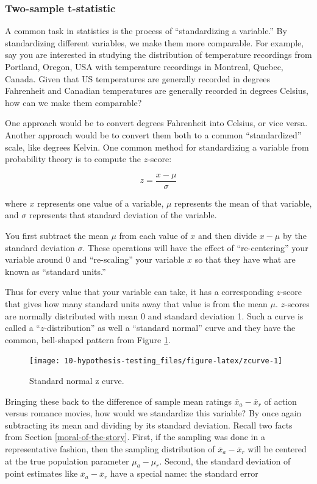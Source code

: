 \documentclass[
]{book}
\begin{document}
\hypertarget{two-sample-t-statistic}{%
\subsubsection*{Two-sample t-statistic}\label{two-sample-t-statistic}}

A common task in statistics is the process of ``standardizing a variable.'' By standardizing different variables, we make them more comparable. For example, say you are interested in studying the distribution of temperature recordings from Portland, Oregon, USA with temperature recordings in Montreal, Quebec, Canada. Given that US temperatures are generally recorded in degrees Fahrenheit and Canadian temperatures are generally recorded in degrees Celsius, how can we make them comparable?

One approach would be to convert degrees Fahrenheit into Celsius, or vice versa. Another approach would be to convert them both to a common ``standardized'' scale, like degrees Kelvin. One common method for standardizing a variable from probability theory is to compute the  \(z\)-score:

\[z = \frac{x - \mu}{\sigma}\]

where \(x\) represents one value of a variable, \(\mu\) represents the mean of that variable, and \(\sigma\) represents that standard deviation of the variable.

You first subtract the mean \(\mu\) from each value of \(x\) and then divide \(x - \mu\) by the standard deviation \(\sigma\). These operations will have the effect of ``re-centering'' your variable around 0 and ``re-scaling'' your variable \(x\) so that they have what are known as ``standard units.''

Thus for every value that your variable can take, it has a corresponding \(z\)-score that gives how many standard units away that value is from the mean \(\mu\). \(z\)-scores are normally distributed with mean 0 and standard deviation 1. Such a curve is called a ``\(z\)-distribution'' as well a ``standard normal'' curve and they have the common, bell-shaped pattern from Figure \ref{fig:zcurve}.

\begin{figure}
\texttt{[image: 10-hypothesis-testing\_files/figure-latex/zcurve-1]} \caption{Standard normal z curve.}\label{fig:zcurve}
\end{figure}

Bringing these back to the difference of sample mean ratings \(\overline{x}_a - \overline{x}_r\) of action versus romance movies, how would we standardize this variable? By once again subtracting its mean and dividing by its standard deviation. Recall two facts from Section \ref{moral-of-the-story}. First, if the sampling was done in a representative fashion, then the sampling distribution of \(\overline{x}_a - \overline{x}_r\) will be centered at the true population parameter \(\mu_a - \mu_r\). Second, the standard deviation of point estimates like \(\overline{x}_a - \overline{x}_r\) have a special name: the standard error
\end{document}
